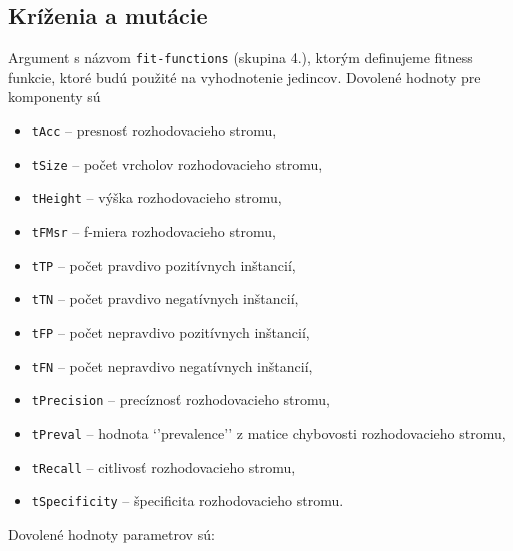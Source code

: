 \subsection*{Kríženia a mutácie}
Argument s názvom \verb|fit-functions| (skupina 4.), ktorým definujeme fitness funkcie, ktoré budú použité na vyhodnotenie jedincov.
Dovolené hodnoty pre komponenty sú 
\begin{itemize}
\item \verb|tAcc| -- presnosť rozhodovacieho stromu,
\item \verb|tSize|  -- počet vrcholov rozhodovacieho stromu,
\item \verb|tHeight| -- výška rozhodovacieho stromu,
\item \verb|tFMsr| -- f-miera rozhodovacieho stromu,
\item \verb|tTP| -- počet pravdivo pozitívnych inštancií,
\item \verb|tTN| -- počet pravdivo negatívnych inštancií,
\item \verb|tFP| -- počet nepravdivo pozitívnych inštancií,
\item \verb|tFN| -- počet nepravdivo negatívnych inštancií,
\item \verb|tPrecision| -- precíznosť rozhodovacieho stromu,
\item \verb|tPreval| -- hodnota `'prevalence'' z matice chybovosti rozhodovacieho stromu,
\item \verb|tRecall| -- citlivosť rozhodovacieho stromu,
\item \verb|tSpecificity| -- špecificita rozhodovacieho stromu.
\end{itemize}

Dovolené hodnoty parametrov sú:

